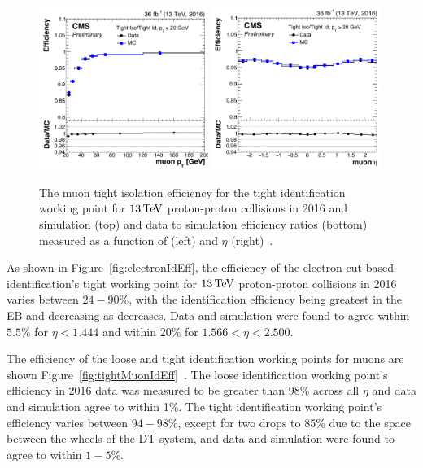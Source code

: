 \begin{figure}[!ht]
\centering
\includegraphics[width=0.49\textwidth]{figs/background-estimation/simulationCorrections/tightMuonIsoEff_pT_2016.pdf}
\includegraphics[width=0.49\textwidth]{figs/background-estimation/simulationCorrections/tightMuonIsoEff_eta_2016.pdf}
\caption{
The muon tight isolation efficiency for the tight identification working point for $13\,\text{Te\hspace{-.08em}V}$ proton-proton collisions in 2016 and simulation (top) and data to simulation efficiency ratios (bottom) measured as a function of \pT (left) and $\eta$ (right)~\cite{CMS-DP-2017-007}.
}
\label{fig:tightMuonIsoEff}
\end{figure}

As shown in Figure~\ref{fig:electronIdEff}, the efficiency of the electron cut-based identification's tight working point for $13\,\text{Te\hspace{-.08em}V}$ proton-proton collisions in 2016 varies between $24 - 90\%$, with the identification efficiency being greatest in the EB and decreasing as \pT decreases.
Data and simulation were found to agree within $5.5\%$ for $\eta < 1.444$ and within $20\%$ for $1.566< \eta < 2.500$.

The efficiency of the loose and tight identification working points for muons are shown Figure~\ref{fig:tightMuonIdEff}~\cite{CMS-DP-2017-007}.
The loose identification working point's efficiency in 2016 data was measured to be greater than 98\% across all $\eta$ and data and simulation agree to within 1\%.
The tight identification working point's efficiency varies between $94 - 98\%$, except for two drops to 85\% due to the space between the wheels of the DT system, and data and simulation were found to agree to within $1-5\%$.

